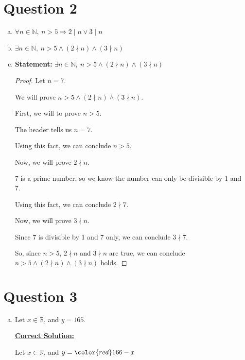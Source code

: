\documentclass[12pt]{article}
\begin{document}
\section*{Question 2}
\begin{enumerate}[a.]
    \item $\forall n \in \mathbb{N},\:n > 5 \Rightarrow 2 \mid n \lor 3 \mid n$
    \item $\exists n \in \mathbb{N},\: n > 5 \land (2 \nmid n) \land (3 \nmid n)$
    \item

    \textbf{Statement:} $\exists n \in \mathbb{N},\: n > 5 \land (2 \nmid n) \land (3 \nmid n)$

    \begin{proof}
        Let $n = 7$.

        \bigskip

        We will prove $n>5 \land (2 \nmid n) \land (3 \nmid n)$.

        \bigskip

        First, we will to prove $n > 5$.

        \bigskip

        The header tells us $n = 7$.

        \bigskip

        Using this fact, we can conclude $n > 5$.

        \bigskip

        Now, we will prove $2 \nmid n$.

        \bigskip

        7 is a prime number, so we know the number can only be divisible by 1 and 7.

        \bigskip

        Using this fact, we can conclude $2 \nmid 7$.

        \bigskip

        Now, we will prove $3 \nmid n$.

        \bigskip

        Since 7 is divisible by 1 and 7 only, we can conclude $3 \nmid 7$.

        \bigskip

        So, since $n > 5$, $2 \nmid n$ and $3 \nmid n$ are true, we
        can conclude $n>5 \land (2 \nmid n) \land (3 \nmid n)$ holds.
    \end{proof}
\end{enumerate}

\section*{Question 3}
\begin{enumerate}[a.]
    \item

    Let $x \in \mathbb{R}$, and $y = 165$.

    \begin{mdframed}
        \underline{\textbf{Correct Solution:}}

        \bigskip

        Let $x \in \mathbb{R}$, and $y = \color{red} 166 - x$
    \end{mdframed}
\end{enumerate}
\end{document}
